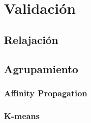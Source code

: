 \chapter{Validación}\label{chapter:validation}

\section{Relajación}
\section{Agrupamiento}
\subsection{Affinity Propagation}
\subsection{K-means}


